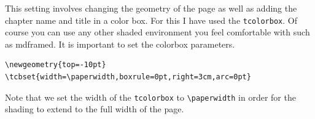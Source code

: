 This setting involves changing the geometry of the page as well as adding the chapter name and title in a color box. For this I have used the \lstinline{tcolorbox}. Of course you can use any other shaded environment you feel comfortable with such as mdframed. It is important to set the colorbox parameters.

\begin{lstlisting}
\newgeometry{top=-10pt}
\tcbset{width=\paperwidth,boxrule=0pt,right=3cm,arc=0pt}
\end{lstlisting}

Note that we set the width of the \lstinline{tcolorbox} to \lstinline{\paperwidth} in order for the shading to extend to the full width of the page.

\restoregeometry
